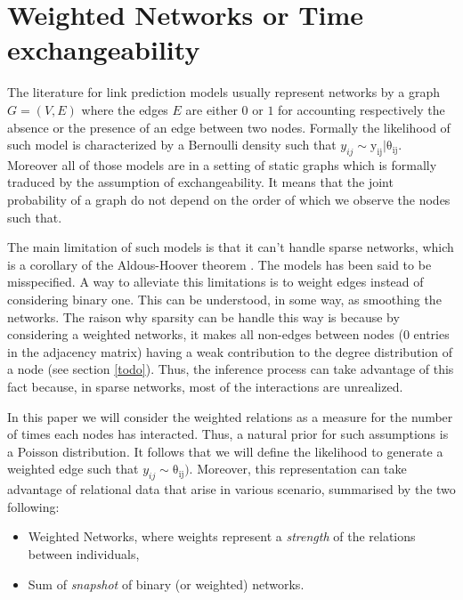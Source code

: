 
\section{Weighted Networks or Time exchangeability}

The literature for link prediction models \cite{review1,review2} usually represent networks by a graph $G=(V,E)$ where the edges $E$ are either $0$ or $1$ for accounting respectively the absence or the presence of an edge between two nodes. Formally the likelihood of such model is characterized by a Bernoulli density such that $y_{ij} \sim \mathrm{y_{ij} |\theta_{ij}}$. Moreover all of those models are in a setting of static graphs which is formally traduced by the assumption of exchangeability. It means that the joint probability of a graph do not depend on the order of which we observe the nodes such that. %

The main limitation of such models is that it can't handle sparse networks, which is a corollary of the Aldous-Hoover theorem \cite{orbanz2015bayesian}. The models has been said to be misspecified. A way to alleviate this limitations is to weight edges instead of considering binary one. This can be understood, in some way, as smoothing the networks. The raison why sparsity can be handle this way is because by considering a weighted networks, it makes all non-edges between nodes (0 entries in the adjacency matrix) having a weak contribution to the degree distribution of a node (see section \ref{todo}). Thus, the inference process can take advantage of this fact because, in sparse networks, most of the interactions are unrealized.

In this paper we will consider the weighted relations as a measure for the number of times each nodes has interacted. Thus, a natural prior for such assumptions is a Poisson distribution. It follows that we will define the likelihood to generate a weighted edge such that $y_{ij} \sim \mathrm{\theta_{ij})}$. Moreover,  this representation can take advantage of relational data that arise in various scenario, summarised by the two following:
\begin{itemize}
\item Weighted Networks, where weights represent a \emph{strength} of the relations between individuals,
\item Sum of \emph{snapshot} of binary (or weighted) networks.
\end{itemize}

